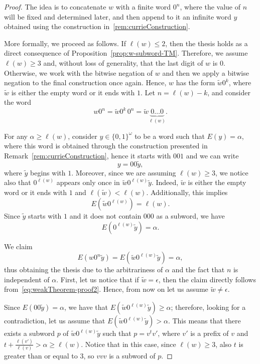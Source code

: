 \documentclass[12pt]{article}
\theoremstyle{plain}\newtheorem{teo}{Theorem}
\theoremstyle{plain}\newtheorem{proposition}[teo]{Proposition}
\theoremstyle{plain}\newtheorem{lemma}[teo]{Lemma}
\theoremstyle{plain}\newtheorem{corollary}[teo]{Corollary}
\theoremstyle{plain}\newtheorem{conjecture}[teo]{Conjecture}
\theoremstyle{definition}\newtheorem{definition}[teo]{Definition}
\theoremstyle{remark}\newtheorem{remark}[teo]{Remark}
\theoremstyle{definition}\newtheorem{example}[teo]{Example}
\numberwithin{teo}{section}
\numberwithin{equation}{section}
\begin{document}
\begin{proof}
	The idea is
	to concatenate
	$w$ with a finite word $0^n$,
	where the value of $n$ will be fixed and determined later, 
	and then append to it an infinite word
	$y$ obtained using the construction in~\ref{rem:currieConstruction}.

	More formally, we proceed as follows.
	If $\ell(w) \le 2$, then the thesis
	holds as a direct consequence 
	of Proposition~\ref{prop:w-subword-TM}.
	Therefore, we assume $\ell(w) \ge 3$ and,
	without loss of generality,
	that the last digit of $w$ is $0$.
	Otherwise, we work with the bitwise negation of $w$
	and then we apply a bitwise negation 
	to the final construction once again.
	Hence, $w$ has the form $\tilde{w}0^k$,
	where $\tilde{w}$ is either the empty word
	or it ends with $1$.
	Let $n = \ell(w) - k $,
	and consider the word
	\[
		w0^n = 
		\tilde{w}0^k\, 0^n
		= \tilde{w}\underbrace{0\dots 0}_{\ell(w) }.
	\]

    For any $\alpha \ge \ell(w)$,
	consider $y \in \{0,1\}^\omega$ to be a word such that $E(y) = \alpha$,
	where this word is obtained through the construction 
	presented in Remark~\ref{rem:currieConstruction},
	hence it starts
	with $001$ and we can write
	\[
		y = 00\tilde{y},
	\]
	where $\tilde{y}$ begins with $1$.
	Moreover, since we are assuming $\ell(w)\ge 3$,
	we notice also that $0^{\ell(w)}$
	appears only once in $\tilde{w}0^{\ell(w)}\tilde{y}$.
	Indeed, $\tilde{w}$ is either the empty word
	or it ends with $1$ and $\ell(\tilde{w}) < \ell(w)$.
%	
	Additionally, this implies 
	\begin{equation}
		\label{eq:weakTheorem-proof1}
		E(\tilde{w}0^{\ell(w)}) = \ell(w).
	\end{equation}
	Since $\tilde{y}$ starts with $1$
	and it does not contain $000$ as a subword,
	we have
	\begin{equation}
		\label{eq:weakTheorem-proof2}
		E(0^{\ell(w)}\tilde{y}) = \alpha.
	\end{equation}

	We claim
	\[
		E(w0^n\tilde{y}) = E(\tilde{w}0^{\ell(w)}\tilde{y}) = \alpha,
	\]
	thus obtaining the thesis due to the arbitrariness of $\alpha$
	and the fact that $n$ is independent of $\alpha$.
	First, let us notice that if $\tilde{w} = \epsilon$,
	then the claim directly follows from~\eqref{eq:weakTheorem-proof2}.
	Hence, from now on let us assume $\tilde{w}\ne \epsilon$.

	Since $E(00\tilde{y}) = \alpha$, 
	we have that
	$E(\tilde{w}0^{\ell(w)}\tilde{y}) \ge \alpha$;
	therefore, looking for a contradiction,
	let us assume that $E(\tilde{w}0^{\ell(w)}\tilde{y}) > \alpha$.
	This means that there exists a subword $p$ of $\tilde{w}0^{\ell(w)}\tilde{y}$
	such that $p=v^tv'$,
	where $v'$ is a prefix of $v$
	and $t+\frac{\ell(v')}{\ell(v)}>\alpha\ge\ell(w)$.
	Notice that in this case, since $\ell(w) \ge 3$,
	also $t$ is greater than or equal to $3$,
	so $vvv$ is a subword of $p$.


\end{proof}
\end{document}
